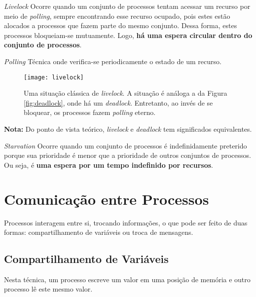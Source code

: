 \begin{definicao}{\textit{Livelock}}
  Ocorre quando um conjunto de processos tentam acessar um recurso por meio de \textit{polling}, sempre encontrando esse recurso ocupado, pois estes estão alocados a processos que fazem parte do mesmo conjunto. Dessa forma, estes processos bloqueiam-se mutuamente. Logo, \textbf{há uma espera circular dentro do conjunto de processos}.
\end{definicao}

\begin{definicao}{\textit{Polling}}
  Técnica onde verifica-se periodicamente o estado de um recurso.
\end{definicao}

\begin{figure}[ht]
  \centering
  \texttt{[image: livelock]}
  \caption{Uma situação clássica de \textit{livelock}. A situação é análoga a da Figura \ref{fig:deadlock}, onde há um \textit{deadlock}. Entretanto, ao invés de se bloquear, os processos fazem \textit{polling} eterno.}
  \label{fig:livelock}
\end{figure}

\textbf{Nota:} Do ponto de vista teórico, \textit{livelock} e \textit{deadlock} tem significados equivalentes.

\begin{definicao}{\textit{Starvation}}
  Ocorre quando um conjunto de processos é indefinidamente preterido porque sua prioridade é menor que a prioridade de outros conjuntos de processos. Ou seja, é \textbf{uma espera por um tempo indefinido por recursos}.
\end{definicao}










\section{Comunicação entre Processos}
Processos interagem entre si, trocando informações, o que pode ser feito de duas formas: compartilhamento de variáveis ou troca de mensagens.


\subsection{Compartilhamento de Variáveis}
Nesta técnica, um processo escreve um valor em uma posição de memória e outro processo lê este mesmo valor.


